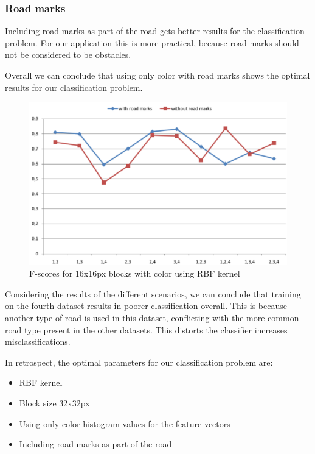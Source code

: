 \documentclass[runningheads,a4paper]{llncs}
\begin{document}
\subsubsection{Road marks}
Including road marks as part of the road gets better results for the classification problem.
For our application this is more practical, because road marks should not be considered to be obstacles.

Overall we can conclude that using only color with road marks shows the optimal results for our classification problem.

\begin{figure}
\centering
\includegraphics[width=\textwidth]{fig/with-vs-without-roadmarks.pdf}
\caption{F-scores for 16x16px blocks with color using RBF kernel}
\label{fig:col-wi-rm}
\end{figure}

Considering the results of the different scenarios, we can conclude that training on the fourth dataset results in poorer classification overall. This is because another type of road is used in this dataset, conflicting with the more common road type present in the other datasets. This distorts the classifier increases misclassifications.

\noindent In retrospect, the optimal parameters for our classification problem are:
\begin{itemize}
\item RBF kernel
\item Block size 32x32px
\item Using only color histogram values for the feature vectors
\item Including road marks as part of the road  
\end{itemize}
\end{document}

